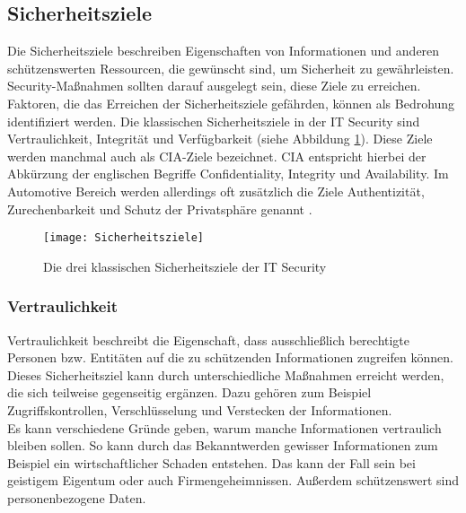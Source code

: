 \subsection{Sicherheitsziele}\label{Sicherheitsziele}
Die Sicherheitsziele beschreiben Eigenschaften von Informationen und anderen schützenswerten Ressourcen, die gewünscht sind, um Sicherheit zu gewährleisten. Security-Maßnahmen sollten darauf ausgelegt sein, diese Ziele zu erreichen. Faktoren, die das Erreichen der Sicherheitsziele gefährden, können als Bedrohung identifiziert werden. Die klassischen Sicherheitsziele in der IT Security sind Vertraulichkeit, Integrität und Verfügbarkeit (siehe Abbildung \ref{fig:Sicherheitsziele}). Diese Ziele werden manchmal auch als CIA-Ziele bezeichnet. CIA entspricht hierbei der Abkürzung der englischen Begriffe Confidentiality, Integrity und Availability. Im Automotive Bereich werden allerdings oft zusätzlich die Ziele Authentizität, Zurechenbarkeit und Schutz der Privatsphäre genannt \cite[6]{Wurm.2022}. \\

\begin{figure}[H]
\centering
\texttt{[image: Sicherheitsziele]}
\label{fig:Sicherheitsziele}
\caption{Die drei klassischen Sicherheitsziele der IT Security}
\end{figure}

\subsubsection{Vertraulichkeit}
\glqq  Vertraulichkeit beschreibt die Eigenschaft, dass ausschließlich berechtigte Personen bzw. Entitäten auf die zu schützenden Informationen zugreifen können.
\grqq{} \cite[7]{Wurm.2022}\\
Dieses Sicherheitsziel kann durch unterschiedliche Maßnahmen erreicht werden, die sich teilweise gegenseitig ergänzen. Dazu gehören zum Beispiel Zugriffskontrollen, Verschlüsselung und Verstecken der Informationen.\\
Es kann verschiedene Gründe geben, warum manche Informationen vertraulich bleiben sollen. So kann durch das Bekanntwerden gewisser Informationen zum Beispiel ein wirtschaftlicher Schaden entstehen. Das kann der Fall sein bei geistigem Eigentum oder auch Firmengeheimnissen. Außerdem schützenswert sind personenbezogene Daten.

